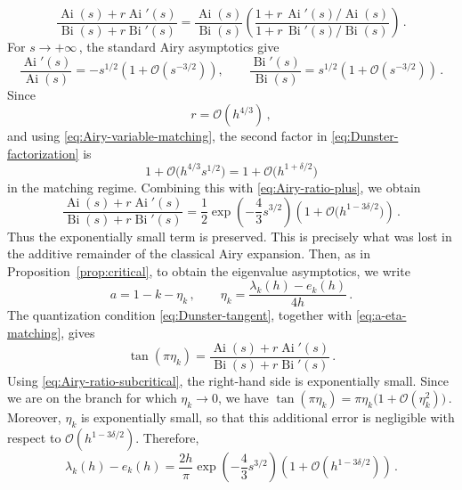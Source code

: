 \documentclass[11pt]{amsart}
\numberwithin{equation}{section}
\theoremstyle{remark}
\newcommand{\Ai}{\operatorname{Ai}}
\newcommand{\Bi}{\operatorname{Bi}}
\begin{document}
\begin{equation}\label{eq:Dunster-factorization}
	\frac{\Ai(s)+r\Ai'(s)}
	{\Bi(s)+r\Bi'(s)}
	=
	\frac{\Ai(s)}{\Bi(s)}
	\left(
	\frac{1+r\,\Ai'(s)/\Ai(s)}
	{1+r\,\Bi'(s)/\Bi(s)}
	\right)\,.
\end{equation}
For $s\to+\infty\,$, the standard Airy asymptotics
\cite[Sec.~9.7]{DLMF} give
\begin{equation}\label{eq:Airy-log-derivatives-plus}
	\frac{\Ai'(s)}{\Ai(s)}
	=
	-s^{1/2}\left(1+\mathcal O(s^{-3/2})\right),
	\qquad
	\frac{\Bi'(s)}{\Bi(s)}
	=
	s^{1/2}\left(1+\mathcal O(s^{-3/2})\right)\,.
\end{equation}
Since
\[
r=\mathcal O(h^{4/3})\,,
\]
and using \eqref{eq:Airy-variable-matching}, the second factor in
\eqref{eq:Dunster-factorization} is
\[
1+\mathcal O\bigl(h^{4/3}s^{1/2}\bigr)
=
1+\mathcal O\bigl(h^{1+\delta/2}\bigr)
\]
in the matching regime. Combining this with
\eqref{eq:Airy-ratio-plus}, we obtain
\begin{equation}\label{eq:Airy-ratio-subcritical}
	\frac{\Ai(s)+r\Ai'(s)}
	{\Bi(s)+r\Bi'(s)}
	=
	\frac12
	\exp\left(-\frac43s^{3/2}\right)
	\left(1+\mathcal O\bigl(h^{1-3\delta/2}\bigr)\right)\,.
\end{equation}
Thus the exponentially small term is preserved.
This is precisely what was lost in the additive remainder of the
classical Airy expansion. Then, as in Proposition~\ref{prop:critical}, to obtain the eigenvalue
asymptotics, we write
\begin{equation}\label{eq:a-eta-matching}
	a=1-k-\eta_k\,,
	\qquad
	\eta_k=\frac{\lambda_k(h)-e_k(h)}{4h}\,.
\end{equation}
The quantization condition \eqref{eq:Dunster-tangent}, together with
\eqref{eq:a-eta-matching}, gives
\[
\tan(\pi\eta_k)
=
\frac{\Ai(s)+r\Ai'(s)}
{\Bi(s)+r\Bi'(s)}\,.
\]
Using \eqref{eq:Airy-ratio-subcritical}, the right-hand side is
exponentially small. Since we are on the branch for which
$\eta_k\to0$, we have
$
\tan(\pi\eta_k)
=
\pi\eta_k\bigl(1+\mathcal O(\eta_k^2)\bigr)\,.
$
Moreover, $\eta_k$ is exponentially small, so that this additional
error is negligible with respect to
$\mathcal O(h^{1-3\delta/2})$. Therefore,
\begin{equation}\label{eq:eigenvalue-shift-Airy}
	\lambda_k(h)-e_k(h)
	=
	\frac{2h}{\pi}
	\exp\left(-\frac43s^{3/2}\right)
	\left(1+\mathcal O(h^{1-3\delta/2})\right)\,.
\end{equation}
\end{document}
